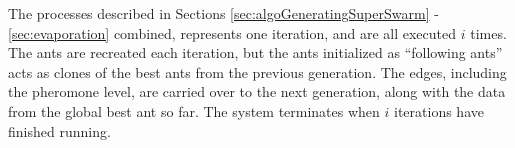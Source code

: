 
The processes described in Sections \ref{sec:algoGeneratingSuperSwarm} - \ref{sec:evaporation} combined, represents one iteration, and are all executed $i$ times. The ants are recreated each iteration, but the ants initialized as ``following ants'' acts as clones of the best ants from the previous generation. The edges, including the pheromone level, are carried over to the next generation, along with the data from the global best ant so far. The system terminates when $i$ iterations have finished running. 